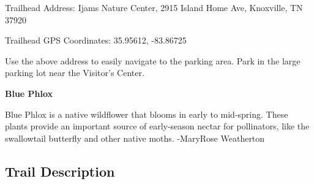 \documentclass[
  letterpaper,
  DIV=11,
  numbers=noendperiod]{scrreprt}
\begin{document}
Trailhead Address: Ijams Nature Center, 2915 Island Home Ave, Knoxville,
TN 37920

Trailhead GPS Coordinates: 35.95612, -83.86725

Use the above address to easily navigate to the parking area. Park in
the large parking lot near the Visitor's Center.

\begin{tcolorbox}[enhanced jigsaw, arc=.35mm, leftrule=.75mm, opacityback=0, breakable, rightrule=.15mm, toprule=.15mm, colframe=quarto-callout-note-color-frame, colback=white, bottomrule=.15mm, left=2mm]
\begin{minipage}[t]{5.5mm}
\textcolor{quarto-callout-note-color}{\faInfo}
\end{minipage}%
\begin{minipage}[t]{\textwidth - 5.5mm}

\vspace{-3mm}\textbf{Blue Phlox}\vspace{3mm}

Blue Phlox is a native wildflower that blooms in early to mid-spring.
These plants provide an important source of early-season nectar for
pollinators, like the swallowtail butterfly and other native moths.
-MaryRose Weatherton

\end{minipage}%
\end{tcolorbox}

\subsection{Trail Description}\label{trail-description-1}
\end{document}
